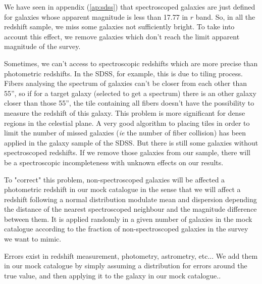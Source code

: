 
We have seen in appendix (\ref{ap:sdss}) that spectroscoped galaxies are just defined for galaxies whose apparent magnitude is less
than \num{17.77} in $r$ band. So, in all the redshift sample, we miss some galaxies not sufficiently bright. To take into account
this effect, we remove galaxies which don't reach the limit apparent magnitude of the survey.


Sometimes, we can't access to spectroscopic redshifts which are more precise than photometric redshifts. In the SDSS, for example,
this is due to tiling process. Fibers analysing the spectrum of galaxies can't be closer from each other than \num{55}'', so if for
a target galaxy (selected to get a spectrum) there is an other galaxy closer than those 55'', the tile containing all fibers doesn't
have the possibility to measure the redshift of this galaxy. This problem is more significant for dense regions in the celestial
plane. A very good algorithm to placing tiles in order to limit the number of missed galaxies (\textit{ie} the number of fiber
collision) has been applied in the galaxy sample of the SDSS. But there is still some galaxies without spectroscoped redshifts. If
we remove those galaxies from our sample, there will be a spectroscopic incompleteness with unknown effects on our results.

To "correct" this problem, non-spectroscoped galaxies will be affected a photometric redshift in our mock catalogue in the sense
that we will affect a redshift following a normal distribution modulate mean and dispersion depending the distance of the nearest
spectroscoped neighbour and the magnitude difference between them. It is applied randomly in a given number of galaxies in the mock
catalogue according to the fraction of non-spectroscoped galaxies in the survey we want to mimic.


Errors exist in redshift measurement, photometry, astrometry, etc... We add them in our mock catalogue by simply assuming a
distribution for errors around the true value, and then applying it to the galaxy in our mock catalogue..
